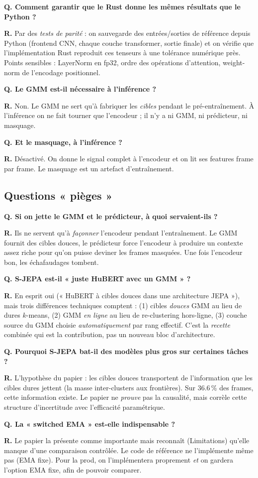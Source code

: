 \documentclass[11pt,a4paper]{article}
\newcommand{\faq}[2]{%
  \par\medskip
  \begin{faqbox}
  \textbf{Q. #1}\par\smallskip
  \textbf{R.} #2
  \end{faqbox}
}
\begin{document}
\faq{Comment garantir que le Rust donne les mêmes résultats que le Python ?}{%
Par des \emph{tests de parité} : on sauvegarde des entrées/sorties de
référence depuis Python (frontend CNN, chaque couche transformer, sortie
finale) et on vérifie que l'implémentation Rust reproduit ces tenseurs à
une tolérance numérique près. Points sensibles : LayerNorm en fp32, ordre
des opérations d'attention, weight-norm de l'encodage positionnel.}

\faq{Le GMM est-il nécessaire à l'inférence ?}{%
Non. Le GMM ne sert qu'à fabriquer les \emph{cibles} pendant le
pré-entraînement. À l'inférence on ne fait tourner que l'encodeur ; il n'y
a ni GMM, ni prédicteur, ni masquage.}

\faq{Et le masquage, à l'inférence ?}{%
Désactivé. On donne le signal complet à l'encodeur et on lit ses features
frame par frame. Le masquage est un artefact d'entraînement.}

\subsection{Questions « pièges »}

\faq{Si on jette le GMM et le prédicteur, à quoi servaient-ils ?}{%
Ils ne servent qu'à \emph{façonner} l'encodeur pendant l'entraînement. Le
GMM fournit des cibles douces, le prédicteur force l'encodeur à produire un
contexte assez riche pour qu'on puisse deviner les frames masquées. Une
fois l'encodeur bon, les échafaudages tombent.}

\faq{S-JEPA est-il « juste HuBERT avec un GMM » ?}{%
En esprit oui (« HuBERT à cibles douces dans une architecture JEPA »), mais
trois différences techniques comptent : (1) cibles \emph{douces} GMM au lieu
de dures $k$-means, (2) GMM \emph{en ligne} au lieu de re-clustering
hors-ligne, (3) couche source du GMM choisie \emph{automatiquement} par
rang effectif. C'est la \emph{recette} combinée qui est la contribution,
pas un nouveau bloc d'architecture.}

\faq{Pourquoi S-JEPA bat-il des modèles plus gros sur certaines tâches ?}{%
L'hypothèse du papier : les cibles douces transportent de l'information que
les cibles dures jettent (la masse inter-clusters aux frontières). Sur
36.6\,\% des frames, cette information existe. Le papier ne \emph{prouve}
pas la causalité, mais corrèle cette structure d'incertitude avec
l'efficacité paramétrique.}

\faq{La « switched EMA » est-elle indispensable ?}{%
Le papier la présente comme importante mais reconnaît (Limitations) qu'elle
manque d'une comparaison contrôlée. Le code de référence ne l'implémente
même pas (EMA fixe). Pour la prod, on l'implémentera proprement \emph{et}
on gardera l'option EMA fixe, afin de pouvoir comparer.}
\end{document}
